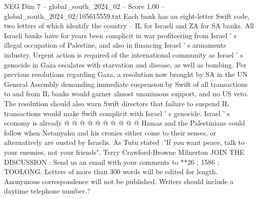 \begin{textsample}{NEG Dim 7 – global\_south\_2024\_02 – Score 1.00 – global\_south\_2024\_02/105615559.txt}
Each bank has an eight-letter Swift code, two letters of which identify the country -- IL for Israeli and ZA for SA banks.
All Israeli banks have for years been complicit in war profiteering from Israel ' s illegal occupation of Palestine, and also in financing Israel ' s armaments industry.
Urgent action is required of the international community as Israel ' s genocide in Gaza escalates with starvation and disease, as well as bombing.
Per previous resolutions regarding Gaza, a resolution now brought by SA in the UN General Assembly demanding immediate suspension by Swift of all transactions to and from IL banks would garner almost unanimous support, and no US veto.
The resolution should also warn Swift directors that failure to suspend IL transactions would make Swift complicit with Israel ' s genocide.
Israel ' s economy is already @ @ @ @ @ @ @ @ @ @ Hamas and the Palestinians could follow when Netanyahu and his cronies either come to their senses, or alternatively are ousted by Israelis.
As Tutu stated :"If you want peace, talk to your enemies, not your friends".
Terry Crawford-Browne Milnerton JOIN THE DISCUSSION : Send us an email with your comments to **26 ; 1586 ; TOOLONG.
Letters of more than 300 words will be edited for length.
Anonymous correspondence will not be published.
Writers should include a daytime telephone number.?

\end{textsample}
